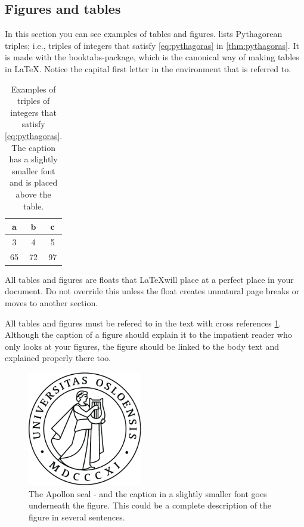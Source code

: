 \documentclass[UKenglish,bachelor]{uiomaster}  %
\begin{document}
\subsection{Figures and tables}
In this section you can see examples of tables and figures.  lists Pythagorean triples; i.e., triples of integers that satisfy \cref{eq:pythagoras} in \cref{thm:pythagoras}. It is made with the booktabs-package, which is the canonical way of making tables in \LaTeX. Notice the capital first letter in the environment that is referred to. 

\begin{table}[htbp]
    \caption{Examples of triples of integers that satisfy \cref{eq:pythagoras}. The caption has a slightly smaller font and is placed above the table.}
    \centering
    \begin{tabular}{@{}ccc@{}}
        \toprule
        \(\boldsymbol{a}\) & \(\boldsymbol{b}\) & \(\boldsymbol{c}\)
        \\
        \midrule
        3 & 4 & 5
        \\
        65 & 72 & 97
        \\
        \bottomrule
    \end{tabular}
    \label{tab:tall}
\end{table}

All tables and figures are floats that \LaTeX will place at a perfect place in your document. Do not override this unless the float creates unnatural page breaks or moves to another section. 

All tables and figures must be refered to in the text with cross references \cref{figure}. Although the caption of a figure should explain it to the impatient reader who only looks at your figures, the figure should be linked to the body text and explained properly there too. 

\begin{figure}[htbp] %
\label{figure}
    \centering
    \includegraphics[width=5cm]{uio-fp-segl}
    \caption[The Apollon seal (to appear in LOF)]{The Apollon seal - and the caption in a slightly smaller font goes underneath the figure. This could be a complete description of the figure in several sentences.}
\end{figure}
\end{document}

